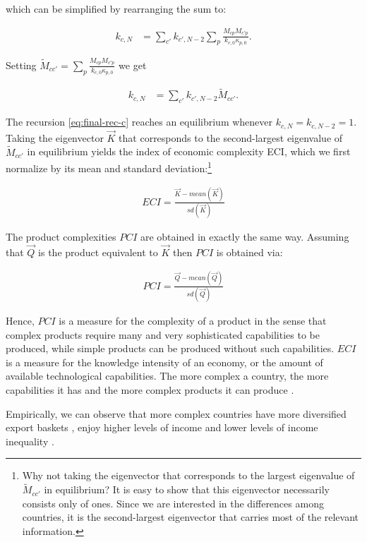 \documentclass[11pt,a4paper]{article}
\begin{document}
which can be simplified by rearranging the sum to:

\begin{align}
k_{c,N} &= \sum_{c'} k_{c',N-2}   \sum_p\frac{M_{cp} M_{c'p}}{k_{c,0} \kappa_{p,0}}. 
\end{align}

Setting $\tilde{M}_{cc'}=\sum_p\frac{M_{cp} M_{c'p}}{k_{c,0} \kappa_{p,0}} $ we get

\begin{align}
k_{c,N} &= \sum_{c'} k_{c',N-2}   \tilde{M}_{cc'}.\label{eq:final-rec-c}
\end{align}

The recursion \eqref{eq:final-rec-c} reaches an equilibrium whenever $k_{c,N}=k_{c,N-2}=1$.
Taking the eigenvector $\vec{K}$ that corresponds to the second-largest eigenvalue of $\tilde{M}_{cc'}$ in equilibrium yields the index of economic complexity ECI, which we first normalize by its mean and standard deviation:\footnote{Why not taking the eigenvector that corresponds to the largest eigenvalue of $\tilde{M}_{cc'}$ in equilibrium? 
It is easy to show that this eigenvector necessarily consists only of ones.
Since we are interested in the differences among countries, it is the second-largest eigenvector that carries most of the relevant information.}

\begin{align}
ECI=\frac{\vec{K}-mean(\vec{K})}{sd(\vec{K})}
\end{align}

The product complexities $PCI$ are obtained in exactly the same way.
Assuming that $\vec{Q}$ is the product equivalent to $\vec{K}$ then $PCI$ is obtained via:

\begin{align}
PCI=\frac{\vec{Q}-mean(\vec{Q})}{sd(\vec{Q})}
\end{align}

Hence, $PCI$ is a measure for the complexity of a product in the sense that complex products require many and very sophisticated capabilities to be produced, while simple products can be produced without such capabilities.
$ECI$ is a measure for the knowledge intensity of an economy, or the amount of available technological capabilities.
The more complex a country, the more capabilities it has and the more complex products it can produce \citep{Hidalgo:2009be}.

Empirically, we can observe that more complex countries have more diversified export baskets \citep[they do not necessarily stop exporting simple products, see][]{Tacchella:2013ko}, enjoy higher levels of income \citep{Hidalgo:2009be} and lower levels of income inequality \citep{Hartmann:2017ic}.
\end{document}
